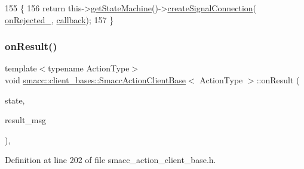 \begin{DoxyCode}
155     \{
156         \textcolor{keywordflow}{return} this->\hyperlink{classsmacc_1_1ISmaccClient_aec51d4712404cb9882b86e4c854bb93a}{getStateMachine}()->\hyperlink{classsmacc_1_1ISmaccStateMachine_adf0f42ade0c65cc471960fe2a7c42da2}{createSignalConnection}(
      \hyperlink{classsmacc_1_1client__bases_1_1SmaccActionClientBase_a4c878cbf2684701323e2b36668f7d721}{onRejected\_}, \hyperlink{sm__ridgeback__barrel__search__1_2servers_2opencv__perception__node_2opencv__perception__node_8cpp_a050e697bd654facce10ea3f6549669b3}{callback});
157     \}
\end{DoxyCode}
\mbox{\label{classsmacc_1_1client__bases_1_1SmaccActionClientBase_a39b897cf72ee070e4172cf76cdd53d5e}} 
\subsubsection{\texorpdfstring{on\+Result()}{onResult()}}
{\footnotesize\ttfamily template$<$typename Action\+Type$>$ \\
void \hyperlink{classsmacc_1_1client__bases_1_1SmaccActionClientBase}{smacc\+::client\+\_\+bases\+::\+Smacc\+Action\+Client\+Base}$<$ Action\+Type $>$\+::on\+Result (\begin{DoxyParamCaption}\item[{const Simple\+Client\+Goal\+State \&}]{state,  }\item[{const Result\+Const\+Ptr \&}]{result\+\_\+msg }\end{DoxyParamCaption})\hspace{0.3cm}{\ttfamily [inline]}, {\ttfamily [protected]}}



Definition at line 202 of file smacc\+\_\+action\+\_\+client\+\_\+base.\+h.


